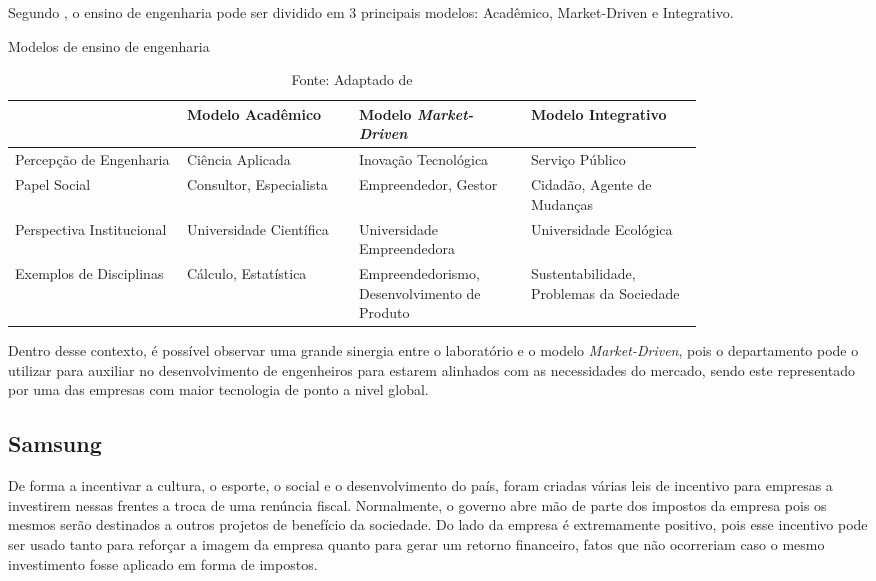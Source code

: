 Segundo , o ensino de engenharia pode ser dividido em 3 principais modelos: Acadêmico, Market-Driven e Integrativo.

\begin{table}[h]
\begin{center}
\caption{Modelos de ensino de engenharia}
\label{tab:modelos_ensino_tab}
{\def\arraystretch{2}\tabcolsep=10pt
\begin{tabular}{>{\raggedright}p{0.2\linewidth}>{\raggedright\arraybackslash}p{0.2\linewidth}>{\raggedright\arraybackslash}p{0.2\linewidth}>{\raggedright\arraybackslash}p{0.2\linewidth}}
\hline
     & Modelo Acadêmico & Modelo \textit{Market-Driven} & Modelo Integrativo \\ \hline
     Percepção de Engenharia & Ciência Aplicada & Inovação Tecnológica & Serviço Público \\
     Papel Social & Consultor, Especialista & Empreendedor, Gestor & Cidadão, Agente de Mudanças \\
     Perspectiva Institucional & Universidade Científica & Universidade Empreendedora & Universidade Ecológica  \\
	 Exemplos de Disciplinas & Cálculo, Estatística & Empreendedorismo, Desenvolvimento de Produto & Sustentabilidade, Problemas da Sociedade \\ \hline
\end{tabular}%
}
\caption* {Fonte: Adaptado de }
\end{center}
\end{table}

Dentro desse contexto, é possível observar uma grande sinergia entre o laboratório e o modelo \textit{Market-Driven}, pois o departamento pode o utilizar para auxiliar no desenvolvimento de engenheiros para estarem alinhados com as necessidades do mercado, sendo este representado por uma das empresas com maior tecnologia de ponto a nivel global.

\subsection{Samsung}
\label{sec:con_samsung}

De forma a incentivar a cultura, o esporte, o social e o desenvolvimento do país, foram criadas várias leis de incentivo para empresas a investirem nessas frentes a troca de uma renúncia fiscal.  Normalmente, o governo abre mão de parte dos impostos da empresa pois os mesmos serão destinados a outros projetos de benefício da sociedade. Do lado da empresa é extremamente positivo, pois esse incentivo pode ser usado tanto para reforçar a imagem da empresa quanto para gerar um retorno financeiro, fatos que não ocorreriam caso o mesmo investimento fosse aplicado em forma de impostos.

